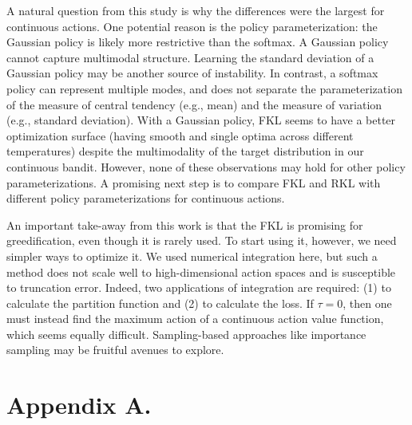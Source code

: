\documentclass[twoside,11pt]{article}
\begin{document}
A natural question from this study is why the differences were the largest for continuous actions. One potential reason is the policy parameterization: the Gaussian policy is likely more restrictive than the softmax. 
A Gaussian policy cannot capture multimodal structure. Learning the standard deviation of a Gaussian policy may be another source of instability. In contrast, a softmax policy can represent multiple modes, and does not separate the parameterization of the measure of central tendency (e.g., mean) and the measure of variation (e.g., standard deviation). 
With a Gaussian policy, FKL seems to have a better optimization surface (having smooth and single optima across different temperatures) despite the multimodality of the target distribution in our continuous bandit. However, none of these observations may hold for other policy parameterizations. A promising next step is to compare FKL and RKL with different policy parameterizations for continuous actions.  

An important take-away from this work is that the FKL is promising for greedification, even though it is rarely used. To start using it, however, we need simpler ways to optimize it. We used numerical integration here, but such a method does not scale well to high-dimensional action spaces and is susceptible to truncation error. Indeed, two applications of integration are required: (1) to calculate the partition function and (2) to calculate the loss. If $\tau = 0$, then one must instead find the maximum action of a continuous action value function, which seems equally difficult. Sampling-based approaches like importance sampling may be fruitful avenues to explore. 





\newpage

\appendix
\section*{Appendix A.}


\label{app:theorem}






\vskip 0.2in

\end{document}
